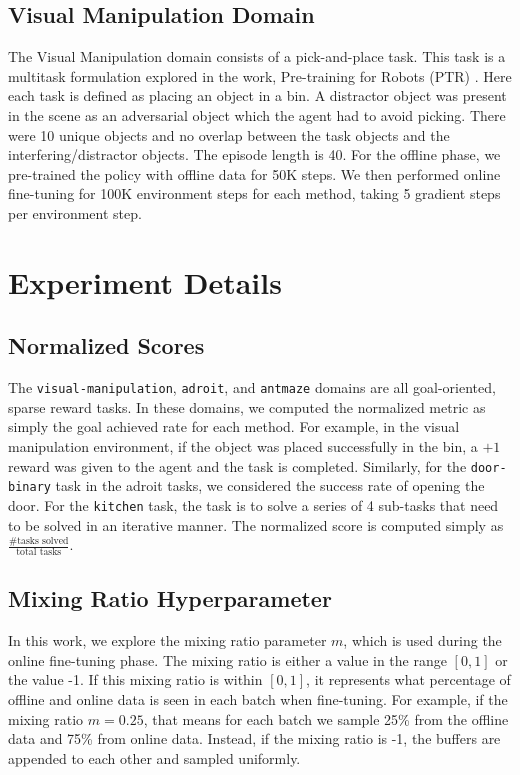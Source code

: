 \subsection{Visual Manipulation Domain} 
The Visual Manipulation domain consists of a pick-and-place task. This task is a multitask formulation explored in the work, Pre-training for Robots (PTR) \cite{2022arXiv221005178K}. Here each task is defined as placing an object in a bin. A distractor object was present in the scene as an adversarial object which the agent had to avoid picking. There were 10 unique objects and no overlap between the task objects and the interfering/distractor objects. The episode length is 40. For the offline phase, we pre-trained the policy with offline data for 50K steps. We then performed online fine-tuning for 100K environment steps for each method, taking 5 gradient steps per environment step.

\section{Experiment Details}
\label{app:calql_hyperparam}

\subsection{Normalized Scores}
\label{appendix:normalized_score}

The \texttt{visual-manipulation}, \texttt{adroit}, and \texttt{antmaze} domains are all goal-oriented, sparse reward tasks. In these domains, we computed the normalized metric as simply the goal achieved rate for each method. For example, in the visual manipulation environment, if the object was placed successfully in the bin, a $+1$ reward was given to the agent and the task is completed. Similarly, for the \texttt{door-binary} task in the adroit tasks, we considered the success rate of opening the door. For the \texttt{kitchen} task, the task is to solve a series of 4 sub-tasks that need to be solved in an iterative manner. The normalized score is computed simply as $\frac{\# \text{tasks solved}}{\text{total tasks}}$.

\subsection{Mixing Ratio Hyperparameter}
\label{appendix:mixing_ratio_overview}
In this work, we explore the mixing ratio parameter $m$, which is used during the online fine-tuning phase. The mixing ratio is either a value in the range $\left[0, 1\right]$ or the value -1. If this mixing ratio is within $\left[0, 1\right]$, it represents what percentage of offline and online data is seen in each batch when fine-tuning. For example, if the mixing ratio $m=0.25$, that means for each batch we sample 25\% from the offline data and 75\% from online data. Instead, if the mixing ratio is -1, the buffers are appended to each other and sampled uniformly.

